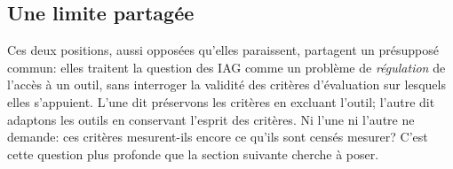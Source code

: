 \subsection*{Une limite partagée}

Ces deux positions, aussi opposées qu'elles paraissent, partagent un présupposé commun: elles traitent la question des IAG comme un problème de \emph{régulation} de l'accès à un outil, sans interroger la validité des critères d'évaluation sur lesquels elles s'appuient. 
L'une dit \og{}préservons les critères en excluant l'outil\fg{}; l'autre dit \og{}adaptons les outils en conservant l'esprit des critères\fg{}. 
Ni l'une ni l'autre ne demande: ces critères mesurent-ils encore ce qu'ils sont censés mesurer? C'est cette question plus profonde que la section suivante cherche à poser.